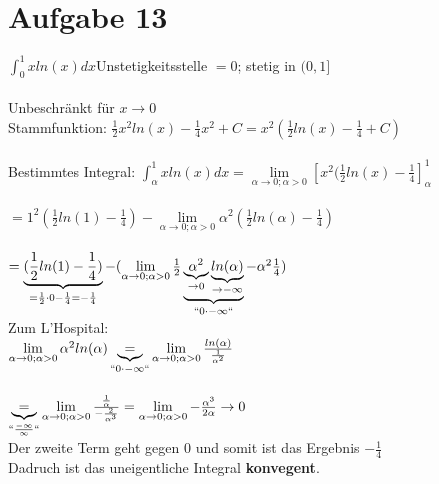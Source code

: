 \documentclass[12pt,a4paper]{article}
\begin{document}
\section*{Aufgabe 13}
$\int_0^1xln(x)dx$\quad Unstetigkeitsstelle $=0$; stetig in $(0,1]$\\
\\
Unbeschränkt für $x\rightarrow 0$
\\
Stammfunktion: $\frac{1}{2}x^2ln(x)-\frac{1}{4}x^2+C=x^2(\frac{1}{2}ln(x)-\frac{1}{4}+C)$\\
\\
Bestimmtes Integral: $\int_\alpha^1xln(x)dx = \lim \limits_{\alpha\rightarrow 0; \alpha > 0}\left[x^2(\frac{1}{2}ln(x)-\frac{1}{4}\right]_\alpha^1$\\
\\
$=1^2(\frac{1}{2}ln(1)-\frac{1}{4})-\lim \limits_{\alpha\rightarrow 0; \alpha > 0}\alpha^2(\frac{1}{2}ln(\alpha)-\frac{1}{4})$\\
\\
$=\underbrace{(\frac{1}{2}ln(1)-\frac{1}{4})}_{=\frac{1}{2}\cdot 0-\frac{1}{4}=-\frac{1}{4}}-(\lim \limits_{\alpha\rightarrow 0; \alpha > 0}\frac{1}{2}\underbrace{\underbrace{\alpha^2}_{\rightarrow 0}\underbrace{ln(\alpha)}_{\rightarrow -\infty}}_{``0\cdot -\infty``}-\alpha^2\frac{1}{4})$
\\
Zum L'Hospital:\\
$\lim \limits_{\alpha\rightarrow 0; \alpha > 0}\alpha^2ln(\alpha)\underbrace{=}_{``0\cdot -\infty``}\lim \limits_{\alpha\rightarrow 0; \alpha > 0}\frac{ln(\alpha)}{\frac{1}{\alpha^2}}$\\
\\
$\underbrace{=}_{``\frac{-\infty}{\infty}``}\lim \limits_{\alpha\rightarrow 0; \alpha > 0}\frac{\frac{1}{\alpha}}{-\frac{2}{\alpha^3}}=\lim \limits_{\alpha\rightarrow 0; \alpha > 0}-\frac{\alpha^3}{2\alpha}\rightarrow 0$\
\\
Der zweite Term geht gegen $0$ und somit ist das Ergebnis $-\frac{1}{4}$\\
Dadruch ist das uneigentliche Integral \textbf{konvegent}.\\
\\
\newpage
\end{document}
